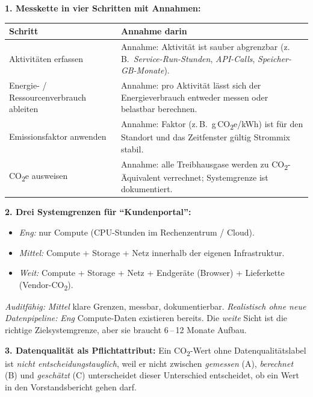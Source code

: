 \documentclass[11pt,a4paper,oneside]{article}
\begin{document}
\begin{loesungbox}
\textbf{1. Messkette in vier Schritten mit Annahmen:}

\smallskip
\begin{tabularx}{\linewidth}{@{}p{4.4cm}X@{}}
\toprule
\textbf{Schritt} & \textbf{Annahme darin} \\
\midrule
Aktivit\"aten erfassen      & Annahme: Aktivit\"at ist sauber abgrenzbar (z.\,B.\ \emph{Service-Run-Stunden}, \emph{API-Calls}, \emph{Speicher-GB-Monate}). \\
Energie- / Ressourcen\-verbrauch ableiten & Annahme: pro Aktivit\"at l\"asst sich der Energieverbrauch entweder messen oder belastbar berechnen. \\
Emissionsfaktor anwenden    & Annahme: Faktor (z.\,B.\ g\,CO\textsubscript{2}e/kWh) ist f\"ur den Standort und das Zeitfenster g\"ultig \textendash{} Strommix stabil. \\
CO\textsubscript{2}e ausweisen & Annahme: alle Treibhausgase werden zu CO\textsubscript{2}-\"Aquivalent verrechnet; Systemgrenze ist dokumentiert. \\
\bottomrule
\end{tabularx}

\smallskip
\textbf{2. Drei Systemgrenzen f\"ur ``Kundenportal'':}
\begin{itemize}
  \item \emph{Eng:} nur Compute (CPU-Stunden im Rechenzentrum / Cloud).
  \item \emph{Mittel:} Compute + Storage + Netz innerhalb der eigenen Infrastruktur.
  \item \emph{Weit:} Compute + Storage + Netz + Endger\"ate (Browser) + Lieferkette (Vendor-CO\textsubscript{2}).
\end{itemize}
\emph{Auditf\"ahig:} \emph{Mittel} \textendash{} klare Grenzen, messbar, dokumentierbar. \emph{Realistisch ohne neue Datenpipeline:} \emph{Eng} \textendash{} Compute-Daten existieren bereits. Die \emph{weite} Sicht ist die richtige Zielsystemgrenze, aber sie braucht 6\,--\,12 Monate Aufbau.

\smallskip
\textbf{3. Datenqualit\"at als Pflichtattribut:} Ein CO\textsubscript{2}-Wert ohne Datenqualit\"atslabel ist \emph{nicht entscheidungstauglich}, weil er nicht zwischen \emph{gemessen} (A), \emph{berechnet} (B) und \emph{gesch\"atzt} (C) unterscheidet \textendash{} dieser Unterschied entscheidet, ob ein Wert in den Vorstandsbericht gehen darf.
\end{loesungbox}
\end{document}
